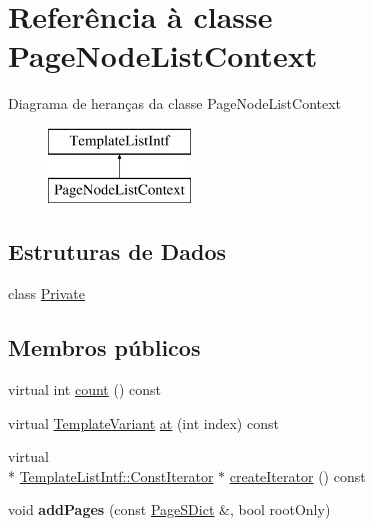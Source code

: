 \hypertarget{class_page_node_list_context}{\section{Referência à classe Page\-Node\-List\-Context}
\label{class_page_node_list_context}
}
Diagrama de heranças da classe Page\-Node\-List\-Context\begin{figure}[H]
\begin{center}
\leavevmode
\includegraphics[height=2.000000cm]{class_page_node_list_context}
\end{center}
\end{figure}
\subsection*{Estruturas de Dados}
\begin{DoxyCompactItemize}
\item 
class \hyperlink{class_page_node_list_context_1_1_private}{Private}
\end{DoxyCompactItemize}
\subsection*{Membros públicos}
\begin{DoxyCompactItemize}
\item 
virtual int \hyperlink{class_page_node_list_context_a0745638c9967e2ed90bc96c012288c55}{count} () const 
\item 
virtual \hyperlink{class_template_variant}{Template\-Variant} \hyperlink{class_page_node_list_context_a55f90d50fcb1378b2a97b9c3ad5bb162}{at} (int index) const 
\item 
virtual \\*
\hyperlink{class_template_list_intf_1_1_const_iterator}{Template\-List\-Intf\-::\-Const\-Iterator} $\ast$ \hyperlink{class_page_node_list_context_a0b1d6dedc3f51750e5cba18f51022f10}{create\-Iterator} () const 
\item 
\hypertarget{class_page_node_list_context_a16c541e751fc2f42405abd92fd478f76}{void {\bfseries add\-Pages} (const \hyperlink{class_page_s_dict}{Page\-S\-Dict} \&, bool root\-Only)}\label{class_page_node_list_context_a16c541e751fc2f42405abd92fd478f76}

\end{DoxyCompactItemize}


